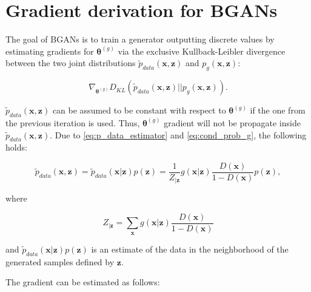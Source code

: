 \chapter{Gradient derivation for BGANs}
\label{sec:appendix_bgans}

The goal of BGANs is to train a generator outputting discrete values by estimating gradients for $\bm{\theta}^{(g)}$ via the exclusive Kullback-Leibler divergence between the two joint distributions $\widetilde{p}_{data}(\bm{x}, \bm{z})$ and $p_g(\bm{x}, \bm{z})$:

\begin{equation}
\nabla_{\bm{\theta}^{(g)}} D_{KL}(\widetilde{p}_{data}(\bm{x}, \bm{z}) || p_g(\bm{x}, \bm{z})).
\end{equation}

$\widetilde{p}_{data}(\bm{x}, \bm{z})$ can be assumed to be constant with respect to $\bm{\theta}^{(g)}$ if the one from the previous iteration is used. Thus, $\bm{\theta}^{(g)}$ gradient will not be propagate inside $\widetilde{p}_{data}(\bm{x}, \bm{z})$. Due to \eqref{eq:p_data_estimator} and \eqref{eq:cond_prob_g}, the following holds:

\begin{equation}
\label{eq:joint_estimator}
\widetilde{p}_{data}(\bm{x}, \bm{z}) = \widetilde{p}_{data}(\bm{x}|\bm{z})p(\bm{z}) = \frac{1}{Z_{|\bm{z}}} g(\bm{x}|\bm{z}) \frac{D(\bm{x})}{1-D(\bm{x})} p(\bm{z}),
\end{equation}

where

\[
Z_{|\bm{z}} = \sum_{\bm{x}} g(\bm{x}|\bm{z}) \frac{D(\bm{x})}{1-D(\bm{x})}
\]

and $\widetilde{p}_{data}(\bm{x}|\bm{z})p(\bm{z})$ is an estimate of the data in the neighborhood of the generated samples defined by $\bm{z}$.

The gradient can be estimated as follows:

